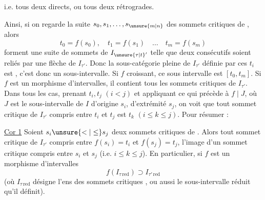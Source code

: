 i.e. tous deux directs, ou tous deux rétrogrades.

Ainsi, si on regarde la suite $s_0,s_1,\ldots,s_{\unsure{m|n}}$
des sommets critiques de , alors 
\[
t_0=f(s_0),\quad t_1=f(s_1)\quad\ldots\quad t_m=f(s_m)
\]
forment une suite de sommets de $I_{\unsure{\tau|t}'}$  telle
que deux consécutifs soient reliés par une flèche
de $I_{\tau'}$. Donc la sous-catégorie pleine de
$I_{\tau'}$ définie par ces $t_i$ est , c'est
donc un sous-intervalle. Si $f$ 
croissant, ce sous intervalle est $[t_0,t_m]$.
 Si $f$ est un morphisme
d'intervalles, il contient tous les sommets
critiques de $I_{\tau'}$. Dans tous les cas, 
prenant $t_i,t_j$ $(i<j)$ et appliquant ce qui précède à $f\mid J$, où $J$ est
le sous-intervalle de $I$ d'origine $s_i$, d'extrémité $s_j$, on voit que tout sommet critique
de $I_{\tau'}$ compris entre $t_i$ et $t_j$ est 
 $t_k$ $(i\leq k\leq j)$. Pour résumer :

\uline{Cor 1} Soient $s_i\unsure{<|\leq}s_j$ deux sommets critiques de
. Alors  tout sommet critique de $I_{\tau'}$
compris entre $f(s_i)=t_i$ et $f(s_j)=t_j$,  
l'image d'un sommet critique  compris entre
$s_i$ et $s_j$ (i.e. $i\leq k\leq j$). En particulier,
si $f$ est un morphisme d'intervalles
\[
f(I_{\tau\,\mathrm{red}})\supset I_{\tau'\,\mathrm{red}}
\]
(où $I_{\tau\,\mathrm{red}}$ désigne l'ens des sommets critiques ,
ou aussi le sous-intervalle réduit qu'il définit).

